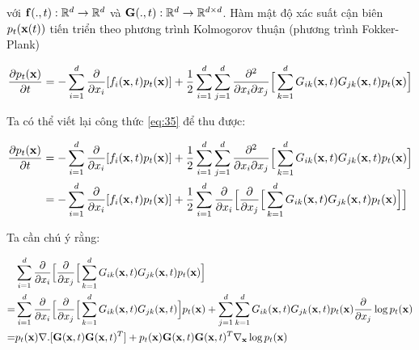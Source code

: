 \documentclass{article} %
\begin{document}
với $\bold{f}(., t): \mathbb{R}^d \rightarrow \mathbb{R}^d$ và $\bold{G}(., t): \mathbb{R}^d \rightarrow \mathbb{R}^{d\times d}$.
Hàm mật độ xác suất cận biên $p_t(\bold{x}(t))$ tiến triển theo phương trình Kolmogorov thuận (phương trình Fokker-Plank) \citep{oksendal2003stochastic}

\begin{equation} \label{eq:35}
    \dfrac{\partial p_t(\bold{x})}{\partial t} = - \sum_{i=1}^d \dfrac{\partial}{\partial x_i} \lbrack f_i (\bold{x}, t)p_t(\bold{x}) \rbrack + \dfrac{1}{2} \sum_{i=1}^d \sum_{j=1}^d \dfrac{\partial^2}{\partial x_i \partial x_j} \Big \lbrack \sum_{k=1}^d G_{ik} (\bold{x}, t) G_{jk}(\bold{x}, t) p_t (\bold{x}) \Big \rbrack
\end{equation}

Ta có thể viết lại công thức \ref{eq:35} để thu được:

\begin{equation} \label{eq:36}
    \begin{aligned}
        \dfrac{\partial p_t(\bold{x})}{\partial t} &= - \sum_{i=1}^d \dfrac{\partial}{\partial x_i} \lbrack f_i (\bold{x}, t)p_t(\bold{x}) \rbrack + \dfrac{1}{2} \sum_{i=1}^d \sum_{j=1}^d \dfrac{\partial^2}{\partial x_i \partial x_j} \Big \lbrack \sum_{k=1}^d G_{ik} (\bold{x}, t) G_{jk}(\bold{x}, t) p_t (\bold{x}) \Big \rbrack \\
        &= - \sum_{i=1}^d \dfrac{\partial}{\partial x_i} \lbrack f_i (\bold{x}, t)p_t(\bold{x}) \rbrack + \dfrac{1}{2} \sum_{i=1}^d \dfrac{\partial}{\partial x_i} \Big \lbrack \dfrac{\partial}{\partial x_j} \Big \lbrack \sum_{k=1}^d G_{ik} (\bold{x}, t) G_{jk}(\bold{x}, t) p_t (\bold{x}) \Big \rbrack \Big \rbrack
    \end{aligned}
\end{equation}

Ta cần chú ý rằng:

\begin{equation*}
    \begin{aligned}
        &\sum_{i=1}^d \dfrac{\partial}{\partial x_i} \Big \lbrack \dfrac{\partial}{\partial x_j} \Big \lbrack \sum_{k=1}^d G_{ik} (\bold{x}, t) G_{jk}(\bold{x}, t) p_t (\bold{x}) \Big \rbrack \\
        =& \sum_{i=1}^d \dfrac{\partial}{\partial x_i} \Big \lbrack \dfrac{\partial}{\partial x_j} \Big \lbrack \sum_{k=1}^d G_{ik} (\bold{x}, t) G_{jk}(\bold{x}, t) \Big \rbrack p_t (\bold{x}) + \sum_{j=1}^d \sum_{k=1}^d G_{ik}(\bold{x}, t) G_{jk}(\bold{x}, t) p_t(\bold{x}) \dfrac{\partial}{\partial x_j} \log p_t(\bold{x}) \\
        =& p_t(\bold{x}) \nabla . \lbrack \bold{G}(\bold{x}, t) \bold{G}(\bold{x}, t)^T \rbrack + p_t(\bold{x}) \bold{G}(\bold{x}, t) \bold{G}(\bold{x}, t)^T \nabla_{\bold{x}} \log p_t (\bold{x})
    \end{aligned}
\end{equation*}
\end{document}
